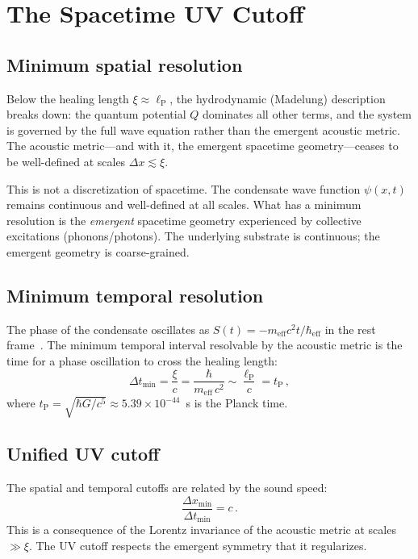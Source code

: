 \documentclass[12pt, a4paper]{article}
\newcommand{\meff}{m_{\mathrm{eff}}}
\newcommand{\heff}{\hbar_{\mathrm{eff}}}
\newcommand{\lP}{\ell_{\mathrm{P}}}
\newcommand{\tP}{t_{\mathrm{P}}}
\begin{document}
\section{The Spacetime UV Cutoff}
\label{sec:uv}

\subsection{Minimum spatial resolution}

Below the healing length $\xi \approx \lP$, the
hydrodynamic (Madelung) description breaks down:
the quantum potential $Q$ dominates all other terms,
and the system is governed by the full wave equation
rather than the emergent acoustic metric. The acoustic
metric---and with it, the emergent spacetime
geometry---ceases to be well-defined at scales
$\Delta x \lesssim \xi$.

This is not a discretization of spacetime. The
condensate wave function $\psi(x,t)$ remains
continuous and well-defined at all scales. What has
a minimum resolution is the \emph{emergent} spacetime
geometry experienced by collective excitations
(phonons/photons). The underlying substrate is
continuous; the emergent geometry is coarse-grained.

\subsection{Minimum temporal resolution}

The phase of the condensate oscillates as
$S(t) = -\meff c^2 t/\heff$ in the rest
frame~\cite{kulangiev_2026a}. The minimum temporal
interval resolvable by the acoustic metric is the
time for a phase oscillation to cross the healing
length:
\begin{equation}
    \Delta t_{\min} = \frac{\xi}{c}
    = \frac{\hbar}{\meff\,c^2}
    \sim \frac{\lP}{c} = \tP\,,
\label{eq:dt_min}
\end{equation}
where $\tP = \sqrt{\hbar G/c^5} \approx 5.39 \times
10^{-44}$~s is the Planck time.

\subsection{Unified UV cutoff}

The spatial and temporal cutoffs are related by the
sound speed:
\begin{equation}
    \frac{\Delta x_{\min}}{\Delta t_{\min}} = c\,.
\label{eq:uv_ratio}
\end{equation}
This is a consequence of the Lorentz invariance of
the acoustic metric at scales $\gg \xi$. The UV
cutoff respects the emergent symmetry that it
regularizes.
\end{document}
